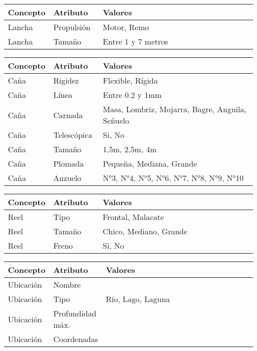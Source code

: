 \documentclass[a4paper,11pt]{article}
\begin{document}
\begin{table}[h!]
\centering
\begin{tabular}{ | p{0.15\linewidth} | p{0.2\linewidth} | p{0.65\linewidth} | }
  \hline
  \textbf{Concepto} & \textbf{Atributo} & \textbf{Valores} \\ \hline
  Lancha & Propulsión & Motor, Remo \\\hline
  Lancha & Tamaño & Entre 1 y 7 metros \\\hline
\end{tabular}
\end{table}

\begin{table}[h!]
\centering
\begin{tabular}{ | p{0.15\linewidth} | p{0.2\linewidth} | p{0.65\linewidth} | }
  \hline
  \textbf{Concepto} & \textbf{Atributo} & \textbf{Valores} \\\hline
  Caña & Rigidez & Flexible, Rígida \\\hline
  Caña & Línea & Entre 0.2 y 1mm \\\hline
  Caña & Carnada & Masa, Lombriz, Mojarra, Bagre, Anguila, Señuelo \\\hline
  Caña & Telescópica & Si, No \\\hline
  Caña & Tamaño & 1,5m, 2,5m, 4m \\\hline
  Caña & Plomada & Pequeña, Mediana, Grande \\\hline
  Caña & Anzuelo & N°3, N°4, N°5, N°6, N°7, N°8, N°9, N°10 \\\hline
\end{tabular}
\end{table}

\begin{table}[h!]
\centering
\begin{tabular}{ | p{0.15\linewidth} | p{0.2\linewidth} | p{0.65\linewidth} | }
  \hline
  \textbf{Concepto} & \textbf{Atributo} & \textbf{Valores} \\\hline
  Reel & Tipo & Frontal, Malacate \\\hline
  Reel & Tamaño & Chico, Mediano, Grande \\\hline
  Reel & Freno & Si, No \\\hline
\end{tabular}
\end{table}

\begin{table}[h!]
\centering
\begin{tabular}{ | p{0.15\linewidth} | p{0.2\linewidth} | p{0.65\linewidth} | }
  \hline
  \textbf{Concepto} & \textbf{Atributo} & \textbf{Valores} \\\hline
  Ubicación & Nombre & \\\hline
  Ubicación & Tipo & Río, Lago, Laguna \\\hline
  Ubicación & Profundidad máx. & \\\hline
  Ubicación & Coordenadas & \\\hline
\end{tabular}
\end{table}
\end{document}
